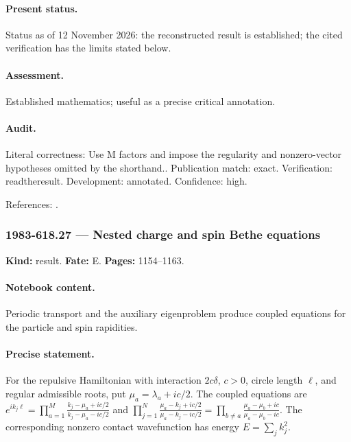 \paragraph{Present status.} Status as of 12 November 2026: the reconstructed result is established; the cited verification has the limits stated below.

\paragraph{Assessment.} Established mathematics; useful as a precise critical annotation.

\paragraph{Audit.} Literal correctness: Use M factors and impose the regularity and nonzero-vector hypotheses omitted by the shorthand.. Publication match: exact. Verification: readtheresult. Development: annotated. Confidence: high.

\noindent References: \citep{faddeev1996bethe}.\par

\subsubsection{1983-618.27 --- Nested charge and spin Bethe equations}

\label{item:1983-618.27}

\noindent\textbf{Kind:} result. \textbf{Fate:} E. \textbf{Pages:} 1154--1163.\par

\paragraph{Notebook content.} Periodic transport and the auxiliary eigenproblem produce coupled equations for the particle and spin rapidities.

\paragraph{Precise statement.} For the repulsive Hamiltonian with interaction $2c\delta$, $c>0$, circle length $\ell$, and regular admissible roots, put $\mu_a=\lambda_a+ic/2$. The coupled equations are $e^{ik_j\ell}=\prod_{a=1}^M\frac{k_j-\mu_a+ic/2}{k_j-\mu_a-ic/2}$ and $\prod_{j=1}^N\frac{\mu_a-k_j+ic/2}{\mu_a-k_j-ic/2}=\prod_{b\ne a}\frac{\mu_a-\mu_b+ic}{\mu_a-\mu_b-ic}$. The corresponding nonzero contact wavefunction has energy $E=\sum_jk_j^2$.

